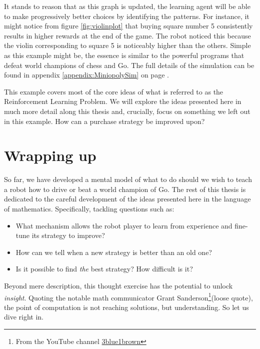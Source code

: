 It stands to reason that as this graph is updated, the learning agent will be
able to make progressively better choices by identifying the patterns. For
instance, it might notice from figure \ref{fig:violinplot} that buying square
number 5 consistently results in higher rewards at the end of the game. The
robot noticed this because the violin corresponding to square 5 is noticeably
higher than the others. Simple as this example might be, the essence is similar
to the powerful programs that defeat world champions of chess and Go. The full
details of the simulation can be found in appendix
\ref{appendix:MiniopolySim} on page
\pageref{appendix:MiniopolySim}.

This example covers most of the core ideas of what is referred to as the
Reinforcement Learning Problem. We will explore the ideas presented here in much
more detail along this thesis and, crucially, focus on something we left out in
this example. How can a purchase strategy be improved upon?

\section{Wrapping up}
So far, we have developed a mental model of what to do should we wish to teach a
robot how to drive or beat a world champion of Go. The rest of this thesis is
dedicated to the careful development of the ideas presented here in the language
of mathematics. Specifically, tackling questions such as:
\begin{itemize}
	\item What mechanism allows the robot player to learn from experience and
		fine-tune its strategy to improve?
	\item How can we tell when a new strategy is better than an old one?
	\item Is it possible to find \textit{the} best strategy?  How difficult is
		it?
\end{itemize}

Beyond mere description, this thought exercise has the potential to unlock
\textit{insight}. Quoting the notable math communicator Grant
Sanderson\footnote{From the YouTube channel
\href{https://www.youtube.com/channel/UCYO_jab_esuFRV4b17AJtAw}{3blue1brown}}(loose
quote), the point of computation is not reaching solutions, but understanding.
So let us dive right in.